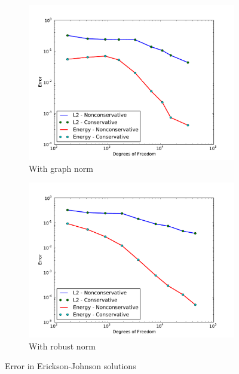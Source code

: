 \documentclass[letterpaper]{article}
\begin{document}
\begin{figure}
\centering
\begin{subfigure}[t]{0.45\textwidth}
\centering
\includegraphics[width=\textwidth]{figs/Erickson/graphError.pdf}
\caption{With graph norm}
\label{fig:ericksonGraphError}
\end{subfigure}
\begin{subfigure}[t]{0.45\textwidth}
\centering
\includegraphics[width=\textwidth]{figs/Erickson/robustError.pdf}
\caption{With robust norm}
\label{fig:ericksonRobustError}
\end{subfigure}
\caption{Error in Erickson-Johnson solutions}
\end{figure}
\end{document}
